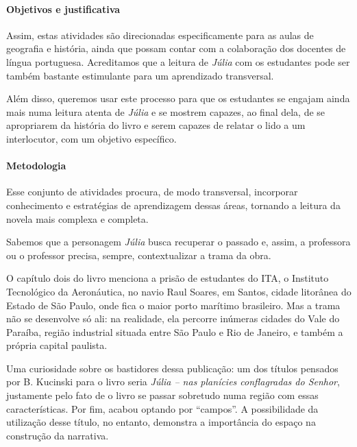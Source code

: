 \documentclass[12pt]{extarticle}
\begin{document}

\paragraph{Objetivos e justificativa}

Assim, estas atividades são direcionadas especificamente para as aulas de geografia
e história, ainda que possam contar com a colaboração dos docentes de
língua portuguesa. Acreditamos que a leitura de \emph{Júlia} com os estudantes pode ser
também bastante estimulante para um aprendizado transversal. 

Além disso, queremos usar este processo para que os estudantes se engajam ainda mais 
numa leitura atenta de \emph{Júlia} e se mostrem capazes, ao final dela,
de se apropriarem da história do livro e serem capazes de relatar o lido
a um interlocutor, com um objetivo específico.


\paragraph{Metodologia}

Esse conjunto de
atividades procura, de modo transversal, incorporar conhecimento e
estratégias de aprendizagem dessas áreas, tornando a leitura da novela
mais complexa e completa.

Sabemos que a personagem \emph{Júlia} busca recuperar o passado e,
assim, a professora ou o professor precisa, sempre, contextualizar a
trama da obra.

O capítulo dois do livro menciona a prisão de estudantes do ITA, o
Instituto Tecnológico da Aeronáutica, no navio Raul Soares, em Santos,
cidade litorânea do Estado de São Paulo, onde fica o maior porto
marítimo brasileiro. Mas a trama não se desenvolve só ali: na realidade,
ela percorre inúmeras cidades do Vale do Paraíba, região industrial
situada entre São Paulo e Rio de Janeiro, e também a própria capital
paulista.


Uma curiosidade sobre os bastidores dessa publicação: um dos títulos
pensados por B. Kucinski para o livro seria \emph{Júlia -- nas
planícies conflagradas do Senhor}, justamente pelo fato de o livro se
passar sobretudo numa região com essas características. Por fim, acabou
optando por ``campos''. A possibilidade da utilização desse título, no
entanto, demonstra a importância do espaço na construção da narrativa.
\end{document}
